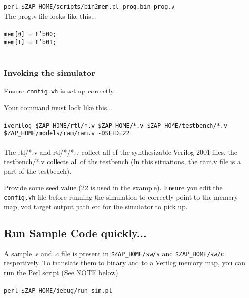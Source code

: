 \documentclass[11pt]{article}
\begin{document}
\texttt{perl \$ZAP\_HOME/scripts/bin2mem.pl prog.bin prog.v}\\
The prog.v file looks like this...\\\\
\texttt{mem[0] = 8'b00;} \\
\texttt{mem[1] = 8'b01;} \\\\


\subsubsection{Invoking the simulator}
Ensure \texttt{config.vh} is set up correctly.

Your command must look like this...\\\\

\texttt{iverilog \$ZAP\_HOME/rtl/*.v \$ZAP\_HOME/*.v \$ZAP\_HOME/testbench/*.v
\$ZAP\_HOME/models/ram/ram.v -DSEED=22}\\\\

The rtl/*.v and rtl/*/*.v collect all of the synthesizable Verilog-2001 files,
the testbench/*.v collects all of the testbench (In this situations, the ram.v
file is a part of the testbench).

Provide some seed value (22 is used in the example). Ensure you edit the 
\texttt{config.vh} file before running the simulation to correctly point to the
memory map, vcd target output path etc for the simulator to pick up.


\subsection{Run Sample Code quickly...}

A sample .s and .c file is present in \texttt{\$ZAP\_HOME/sw/s} and 
\texttt{\$ZAP\_HOME/sw/c} respectively. To translate them to binary and to a 
Verilog memory map, you can run the Perl script (See NOTE below) \\\\ 

\texttt{perl \$ZAP\_HOME/debug/run\_sim.pl} \\\\ 
\end{document}
